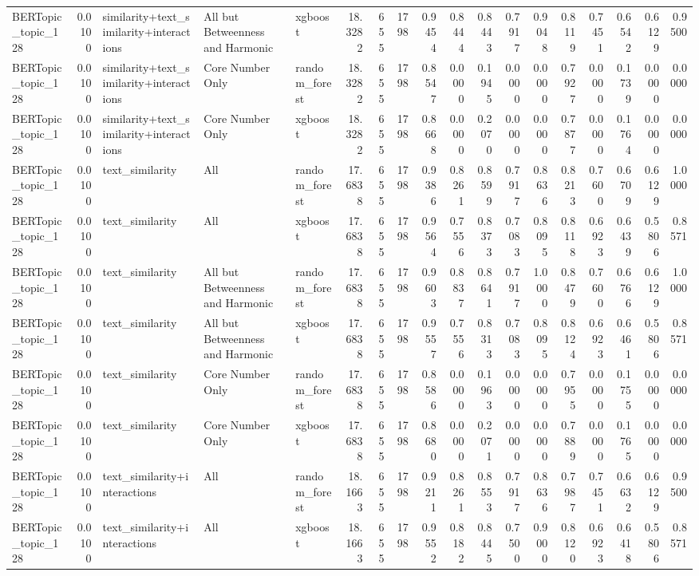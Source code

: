 \begin{tabular}{lrlllrrrrrrrrrrrrr}
BERTopic_topic_128 & 0.0100 & similarity+text_similarity+interactions & All but Betweenness and Harmonic & xgboost & 18.3282 & 655 & 1798 & 0.9454 & 0.8444 & 0.8443 & 0.7917 & 0.9048 & 0.8119 & 0.7451 & 0.6542 & 0.6129 & 0.9500 \\
BERTopic_topic_128 & 0.0100 & similarity+text_similarity+interactions & Core Number Only & random_forest & 18.3282 & 655 & 1798 & 0.8547 & 0.0000 & 0.1945 & 0.0000 & 0.0000 & 0.7927 & 0.0000 & 0.1739 & 0.0000 & 0.0000 \\
BERTopic_topic_128 & 0.0100 & similarity+text_similarity+interactions & Core Number Only & xgboost & 18.3282 & 655 & 1798 & 0.8668 & 0.0000 & 0.2070 & 0.0000 & 0.0000 & 0.7877 & 0.0000 & 0.1764 & 0.0000 & 0.0000 \\
BERTopic_topic_128 & 0.0100 & text_similarity & All & random_forest & 17.6838 & 655 & 1798 & 0.9386 & 0.8261 & 0.8599 & 0.7917 & 0.8636 & 0.8213 & 0.7600 & 0.6709 & 0.6129 & 1.0000 \\
BERTopic_topic_128 & 0.0100 & text_similarity & All & xgboost & 17.6838 & 655 & 1798 & 0.9564 & 0.7556 & 0.8373 & 0.7083 & 0.8095 & 0.8118 & 0.6923 & 0.6439 & 0.5806 & 0.8571 \\
BERTopic_topic_128 & 0.0100 & text_similarity & All but Betweenness and Harmonic & random_forest & 17.6838 & 655 & 1798 & 0.9603 & 0.8837 & 0.8641 & 0.7917 & 1.0000 & 0.8479 & 0.7600 & 0.6766 & 0.6129 & 1.0000 \\
BERTopic_topic_128 & 0.0100 & text_similarity & All but Betweenness and Harmonic & xgboost & 17.6838 & 655 & 1798 & 0.9557 & 0.7556 & 0.8313 & 0.7083 & 0.8095 & 0.8124 & 0.6923 & 0.6461 & 0.5806 & 0.8571 \\
BERTopic_topic_128 & 0.0100 & text_similarity & Core Number Only & random_forest & 17.6838 & 655 & 1798 & 0.8586 & 0.0000 & 0.1963 & 0.0000 & 0.0000 & 0.7955 & 0.0000 & 0.1755 & 0.0000 & 0.0000 \\
BERTopic_topic_128 & 0.0100 & text_similarity & Core Number Only & xgboost & 17.6838 & 655 & 1798 & 0.8680 & 0.0000 & 0.2071 & 0.0000 & 0.0000 & 0.7889 & 0.0000 & 0.1765 & 0.0000 & 0.0000 \\
BERTopic_topic_128 & 0.0100 & text_similarity+interactions & All & random_forest & 18.1663 & 655 & 1798 & 0.9211 & 0.8261 & 0.8553 & 0.7917 & 0.8636 & 0.7987 & 0.7451 & 0.6632 & 0.6129 & 0.9500 \\
BERTopic_topic_128 & 0.0100 & text_similarity+interactions & All & xgboost & 18.1663 & 655 & 1798 & 0.9552 & 0.8182 & 0.8445 & 0.7500 & 0.9000 & 0.8120 & 0.6923 & 0.6418 & 0.5806 & 0.8571 \\

\end{tabular}

